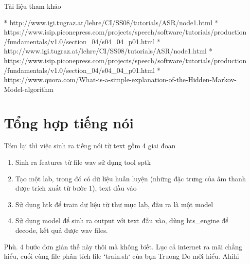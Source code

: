 Tài liệu tham khảo

* http://www.igi.tugraz.at/lehre/CI/SS08/tutorials/ASR/node1.html
* https://www.isip.piconepress.com/projects/speech/software/tutorials/production/fundamentals/v1.0/section_04/s04_04_p01.html
* http://www.igi.tugraz.at/lehre/CI/SS08/tutorials/ASR/node1.html
* https://www.isip.piconepress.com/projects/speech/software/tutorials/production/fundamentals/v1.0/section_04/s04_04_p01.html
* https://www.quora.com/What-is-a-simple-explanation-of-the-Hidden-Markov-Model-algorithm

\chapter{Tổng hợp tiếng nói}


Tóm lại thì việc sinh ra tiếng nói từ text gồm 4 giai đoạn

\begin{enumerate}
  \item Sinh ra features từ file wav sử dụng tool sptk
  \item Tạo một lab, trong đó có dữ liệu huấn luyện (những đặc trưng của âm thanh được trích xuất từ bước 1), text đầu vào
  \item Sử dụng htk để train dữ liệu từ thư mục lab, đầu ra là một model
  \item Sử dụng model để sinh ra output với text đầu vào, dùng hts\_engine để decode, kết quả được wav files.
\end{enumerate}

Phù. 4 bước đơn giản thế này thôi mà không biết. Lục cả internet ra mãi chẳng hiểu, cuối cùng file phân tích file `train.sh` của bạn Truong Do mới hiểu. Ahihi